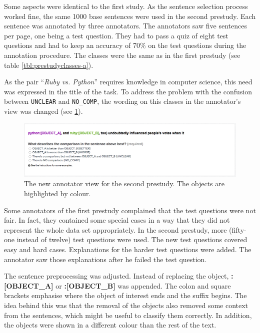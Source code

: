 Some aspects were identical to the first study. As the sentence selection process worked fine, the same 1000 base sentences were used in the second prestudy.  Each sentence was annotated by three annotators. The annotators saw five sentences per page, one being a test question. They had to pass a quiz of eight test questions and had to keep an accuracy of 70\% on the test questions during the annotation procedure. The classes were the same as in the first prestudy (see table \ref{tbl:prestudyclasses-a}).

As the pair \enquote{\emph{Ruby vs. Python}} requires knowledge in computer science, this need was expressed in the title of the task.
To address the problem with the confusion between \texttt{UNCLEAR} and \texttt{NO\_COMP}, the wording on this classes in the annotator's view was changed (see \ref{img:2_question}). 

\begin{figure}[h]
\centering
\includegraphics[width=1\textwidth]{images/prestudy/2_question}

\caption{The new annotator view for the second prestudy. The objects are highlighted by colour.}
\label{img:2_question}
\end{figure}

Some annotators of the first prestudy complained that the test questions were not fair. In fact, they contained some special cases in a way that they did not represent the whole data set appropriately. In the second prestudy, more (fifty-one instead of twelve) test questions were used. The new test questions covered easy and hard cases. Explanations for the harder test questions were added. The annotator saw those explanations after he failed the test question.



The sentence preprocessing was adjusted. Instead of replacing the object, \mbox{\textbf{{\color[HTML]{9A14B2}:{[}OBJECT\_A{]}}}} or \textbf{{\color[HTML]{6CB219}:{[}OBJECT\_B{]}}} was appended. The colon and square brackets emphasise where the object of interest ends and the suffix begins. The idea behind this was that the removal of the objects also removed some context from the sentences, which might be useful to classify them correctly. In addition, the objects were shown in a different colour than the rest of the text.\newline



